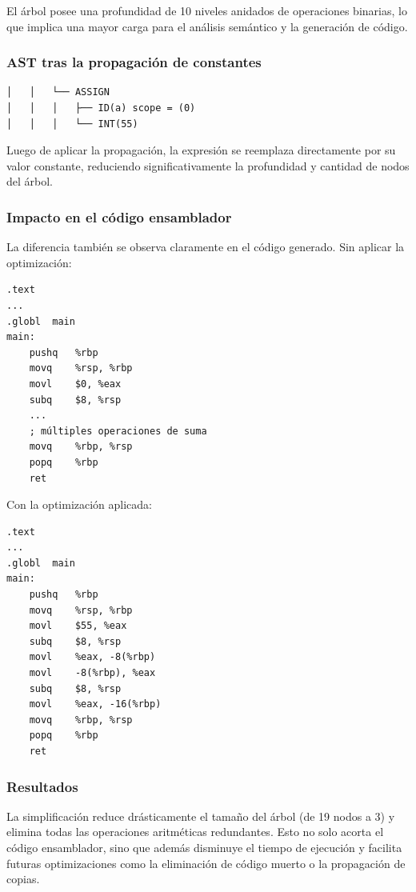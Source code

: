 \documentclass[12pt,a4paper]{article}
\begin{document}
\begin{itemize}
El árbol posee una profundidad de 10 niveles anidados de operaciones binarias, lo que implica una mayor carga para el análisis semántico y la generación de código.

\subsubsection*{AST tras la propagación de constantes}

\begin{verbatim}
│   │   └── ASSIGN
│   │   │   ├── ID(a) scope = (0)
│   │   │   └── INT(55)
\end{verbatim}

Luego de aplicar la propagación, la expresión se reemplaza directamente por su valor constante, reduciendo significativamente la profundidad y cantidad de nodos del árbol.

\subsubsection*{Impacto en el código ensamblador}

La diferencia también se observa claramente en el código generado.  
Sin aplicar la optimización:

\begin{verbatim}
.text
...
.globl  main
main:
    pushq   %rbp
    movq    %rsp, %rbp
    movl    $0, %eax
    subq    $8, %rsp
    ...
    ; múltiples operaciones de suma
    movq    %rbp, %rsp
    popq    %rbp
    ret
\end{verbatim}

Con la optimización aplicada:

\begin{verbatim}
.text
...
.globl  main
main:
    pushq   %rbp
    movq    %rsp, %rbp
    movl    $55, %eax
    subq    $8, %rsp
    movl    %eax, -8(%rbp)
    movl    -8(%rbp), %eax
    subq    $8, %rsp
    movl    %eax, -16(%rbp)
    movq    %rbp, %rsp
    popq    %rbp
    ret
\end{verbatim}

\subsubsection*{Resultados}

La simplificación reduce drásticamente el tamaño del árbol (de 19 nodos a 3) y elimina todas las operaciones aritméticas redundantes.  
Esto no solo acorta el código ensamblador, sino que además disminuye el tiempo de ejecución y facilita futuras optimizaciones como la eliminación de código muerto o la propagación de copias.


\end{itemize}
\end{document}
